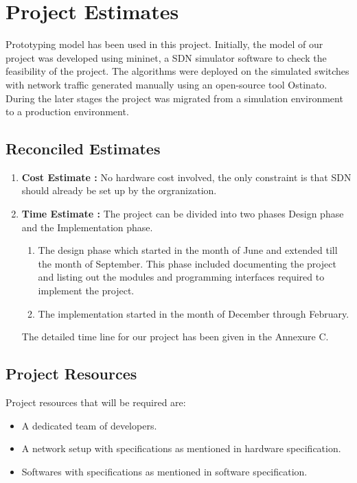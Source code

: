 \documentclass[12pt,a4paper,final]{report}
\begin{document}
\section{Project Estimates}

Prototyping model has been used in this project. Initially, the model of our project was developed using mininet, a SDN simulator software to check the feasibility of the project. The algorithms were deployed on the simulated switches with network traffic generated manually using an open-source tool Ostinato. During the later stages the project was migrated from a simulation environment to a production environment.


\subsection{Reconciled Estimates}
\begin{enumerate}
\item
\textbf{Cost Estimate :} No hardware cost involved, the only constraint is that SDN should already be set up by the orgranization.


\item
\textbf{Time Estimate :} The project can be divided into two phases Design phase and the Implementation phase. 

\begin{enumerate}
\item
The design phase which started in the month of June and extended till the month of September. This phase included documenting the project and listing out the modules and programming interfaces required to implement the project.

\item
The implementation started in the month of December through February. 

\end{enumerate}

The detailed time line for our project has been given in the Annexure C.

\end{enumerate}

\subsection{Project Resources}
Project resources that will be required are:

\begin{itemize}
\item
A dedicated team of developers.
\item
A network setup with specifications as mentioned in hardware specification.
\item
Softwares with specifications as mentioned in software specification.
\end{itemize}
\end{document}
